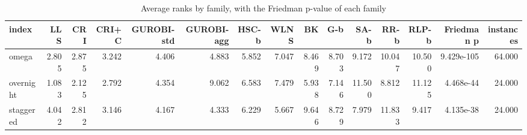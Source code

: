 \begin{table}[htbp]
\centering
\small
\caption{Average ranks by family, with the Friedman p-value of each family}
\label{tab:E4a_equal_budgets_b10_ranks_by_family}
\begin{tabular}{lrrrrrrrrrrrrrr}
\toprule
index & LLS & CRI & CRI+C & GUROBI-std & GUROBI-agg & HSC-b & WLNS & BK & G-b & SA-b & RR-b & RLP-b & Friedman p & instances \\
\midrule
omega & 2.805 & 2.875 & 3.242 & 4.406 & 4.883 & 5.852 & 7.047 & 8.469 & 8.703 & 9.172 & 10.047 & 10.500 & 9.429e-105 & 64.000 \\
overnight & 1.083 & 2.125 & 2.792 & 4.354 & 9.062 & 6.583 & 7.479 & 5.938 & 7.146 & 11.500 & 8.812 & 11.125 & 4.468e-44 & 24.000 \\
staggered & 4.042 & 2.812 & 3.146 & 4.167 & 4.333 & 6.229 & 5.667 & 9.646 & 8.729 & 7.979 & 11.833 & 9.417 & 4.135e-38 & 24.000 \\
\bottomrule
\end{tabular}
\end{table}
